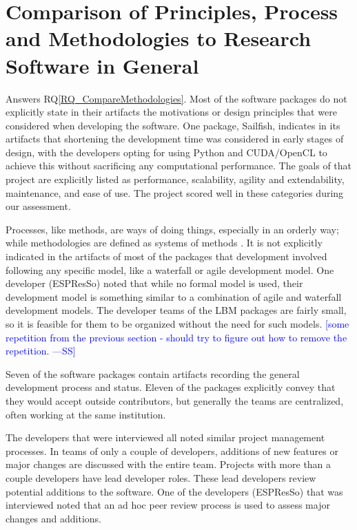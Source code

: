 \documentclass[final, 3p, times, authoryear]{elsarticle}
\newcommand{\authornote}[3]{\textcolor{#1}{[#3 ---#2]}}
\newcommand{\authornote}[3]{}
\newcommand{\wss}[1]{\authornote{blue}{SS}{#1}} %
\newcommand{\rqref}[1]{RQ\ref{#1}}
\begin{document}
\section{Comparison of Principles, Process and Methodologies to Research Software in General} \label{Sec_CompareMethodologies}

Answers \rqref{RQ_CompareMethodologies}.  Most of the software packages do not
explicitly state in their artifacts the motivations or design principles that
were considered when developing the software. One package, Sailfish, indicates
in its artifacts that shortening the development time was considered in early
stages of design, with the developers opting for using Python and CUDA/OpenCL to
achieve this without sacrificing any computational performance. The goals of
that project are explicitly listed as performance, scalability, agility and
extendability, maintenance, and ease of use. The project scored well in these
categories during our assessment.

Processes, like methods, are ways of doing things, especially in an orderly way;
while methodologies are defined as systems of methods
\citep{ghezzi1991fundamentals}. It is not explicitly indicated in the artifacts
of most of the packages that development involved following any specific model,
like a waterfall or agile development model. One developer (ESPResSo) noted that
while no formal model is used, their development model is something similar to a
combination of agile and waterfall development models. The developer teams of
the LBM packages are fairly small, so it is feasible for them to be organized
without the need for such models.  \wss{some repetition from the previous
section - should try to figure out how to remove the repetition.}

Seven of the software packages contain artifacts recording the general
development process and status. Eleven of the packages explicitly convey that
they would accept outside contributors, but generally the teams are centralized,
often working at the same institution. 

The developers that were interviewed all noted similar project management
processes. In teams of only a couple of developers, additions of new features or
major changes are discussed with the entire team. Projects with more than a
couple developers have lead developer roles. These lead developers review
potential additions to the software. One of the developers (ESPResSo) that was
interviewed noted that an ad hoc peer review process is used to assess major
changes and additions.
\end{document}
